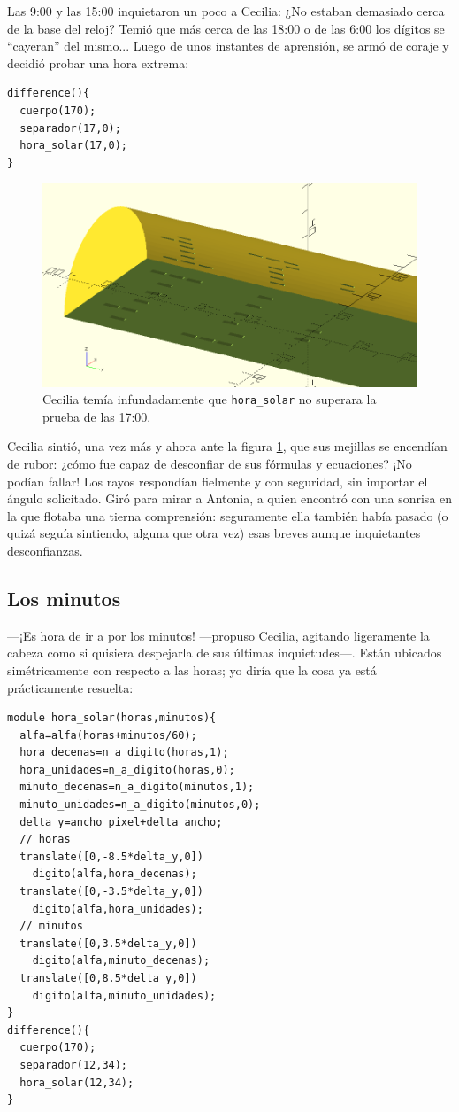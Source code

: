 Las 9:00 y las 15:00 inquietaron un poco a Cecilia: ¿No estaban
demasiado cerca de la base del reloj? Temió que más cerca de las 18:00
o de las 6:00 los dígitos se ``cayeran'' del mismo... Luego de unos
instantes de aprensión, se armó de coraje y decidió probar una hora
extrema:


\begin{lstlisting}
difference(){
  cuerpo(170);
  separador(17,0);
  hora_solar(17,0);
}
\end{lstlisting}%

\begin{figure}[ht]
  \centering \includegraphics[width=.8\textwidth]{imagenes/17_00}
  \caption{Cecilia temía infundadamente que \lstinline!hora_solar! no
    superara la prueba de las 17:00.}
  \label{fig:17_00}
\end{figure}


Cecilia sintió, una vez más y ahora ante la figura \ref{fig:17_00},
que sus mejillas se encendían de rubor: ¿cómo fue capaz de desconfiar
de sus fórmulas y ecuaciones? ¡No podían fallar! Los rayos respondían
fielmente y con seguridad, sin importar el ángulo solicitado. Giró
para mirar a Antonia, a quien encontró con una sonrisa en la que
flotaba una tierna comprensión: seguramente ella también había pasado
(o quizá seguía sintiendo, alguna que otra vez) esas breves aunque
inquietantes desconfianzas.

\subsection{Los minutos}

---¡Es hora de ir a por los minutos! ---propuso Cecilia, agitando
ligeramente la cabeza como si quisiera despejarla de sus últimas
inquietudes---. Están ubicados simétricamente con respecto a las
horas; yo diría que la cosa ya está prácticamente resuelta:

\begin{lstlisting}
module hora_solar(horas,minutos){
  alfa=alfa(horas+minutos/60);
  hora_decenas=n_a_digito(horas,1);
  hora_unidades=n_a_digito(horas,0);
  minuto_decenas=n_a_digito(minutos,1);
  minuto_unidades=n_a_digito(minutos,0);                    
  delta_y=ancho_pixel+delta_ancho;
  // horas                    
  translate([0,-8.5*delta_y,0])
    digito(alfa,hora_decenas);
  translate([0,-3.5*delta_y,0])
    digito(alfa,hora_unidades);  
  // minutos
  translate([0,3.5*delta_y,0])
    digito(alfa,minuto_decenas);
  translate([0,8.5*delta_y,0])
    digito(alfa,minuto_unidades);  
}
difference(){
  cuerpo(170);
  separador(12,34);
  hora_solar(12,34);
}
\end{lstlisting}%

